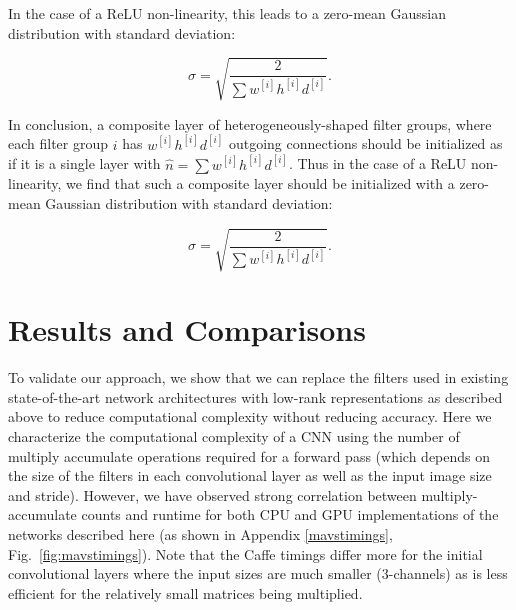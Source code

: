 \documentclass[thesis]{subfiles}
\begin{document}
    In the case of a ReLU non-linearity, this leads to a zero-mean Gaussian distribution with standard deviation:
    
    \begin{equation}
    \sigma = \sqrt{\frac{2}{\sum{ w^{[i]} h^{[i]} d^{[i]}}}}.
    \end{equation}
    
    In conclusion, a composite layer of heterogeneously-shaped filter groups, where each filter group $i$ has $w^{[i]} h^{[i]} d^{[i]}$ outgoing connections should be initialized as if it is a single layer with  $\hat{n} = \sum{ w^{[i]} h^{[i]} d^{[i]}}$. Thus in the case of a ReLU non-linearity, we find that such a composite layer should be initialized with a zero-mean Gaussian distribution with standard deviation:
    
    \begin{equation}
    \sigma = \sqrt{\frac{2}{\sum{ w^{[i]} h^{[i]} d^{[i]}}}}.
    \end{equation}
    
    \section{Results and Comparisons}
    To validate our approach, we show that we can replace the filters used in existing state-of-the-art network architectures with low-rank representations as described above to reduce computational complexity without reducing accuracy. Here we characterize the computational complexity of a CNN using the number of multiply accumulate operations required for a forward pass (which depends on the size of the filters in each convolutional layer as well as the input image size and stride). However, we have observed strong correlation between multiply-accumulate counts and runtime for both CPU and GPU implementations of the networks described here (as shown in Appendix \ref{mavstimings}, Fig.~\ref{fig:mavstimings}). Note that the Caffe timings differ more for the initial convolutional layers where the input sizes are much smaller (3-channels) as  is less efficient for the relatively small matrices being multiplied.
    
\end{document}
